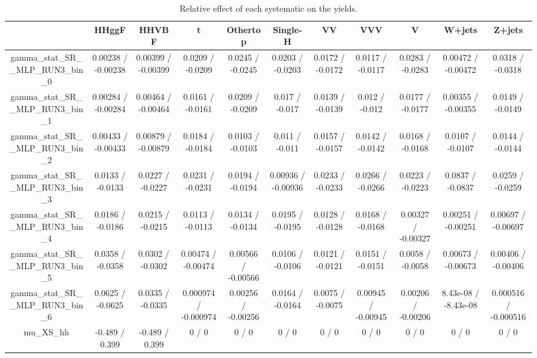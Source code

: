 \documentclass[10pt]{article}
\begin{document}
\begin{table}[htbp]
\begin{center}
\begin{tabular}{|c|c|c|c|c|c|c|c|c|c|c|}
\hline 
      & HHggF      & HHVBF      & t      & Othertop      & Single-H      & VV      & VVV      & V      & W+jets      & Z+jets \\ 
\hline 
  gamma_stat_SR__MLP_RUN3_bin_0 & 0.00238 / -0.00238 & 0.00399 / -0.00399 & 0.0209 / -0.0209 & 0.0245 / -0.0245 & 0.0203 / -0.0203 & 0.0172 / -0.0172 & 0.0117 / -0.0117 & 0.0283 / -0.0283 & 0.00472 / -0.00472 & 0.0318 / -0.0318 \\ 
  gamma_stat_SR__MLP_RUN3_bin_1 & 0.00284 / -0.00284 & 0.00464 / -0.00464 & 0.0161 / -0.0161 & 0.0209 / -0.0209 & 0.017 / -0.017 & 0.0139 / -0.0139 & 0.012 / -0.012 & 0.0177 / -0.0177 & 0.00355 / -0.00355 & 0.0149 / -0.0149 \\ 
  gamma_stat_SR__MLP_RUN3_bin_2 & 0.00433 / -0.00433 & 0.00879 / -0.00879 & 0.0184 / -0.0184 & 0.0103 / -0.0103 & 0.011 / -0.011 & 0.0157 / -0.0157 & 0.0142 / -0.0142 & 0.0168 / -0.0168 & 0.0107 / -0.0107 & 0.0144 / -0.0144 \\ 
  gamma_stat_SR__MLP_RUN3_bin_3 & 0.0133 / -0.0133 & 0.0227 / -0.0227 & 0.0231 / -0.0231 & 0.0194 / -0.0194 & 0.00936 / -0.00936 & 0.0233 / -0.0233 & 0.0266 / -0.0266 & 0.0223 / -0.0223 & 0.0837 / -0.0837 & 0.0259 / -0.0259 \\ 
  gamma_stat_SR__MLP_RUN3_bin_4 & 0.0186 / -0.0186 & 0.0215 / -0.0215 & 0.0113 / -0.0113 & 0.0134 / -0.0134 & 0.0195 / -0.0195 & 0.0128 / -0.0128 & 0.0168 / -0.0168 & 0.00327 / -0.00327 & 0.00251 / -0.00251 & 0.00697 / -0.00697 \\ 
  gamma_stat_SR__MLP_RUN3_bin_5 & 0.0358 / -0.0358 & 0.0302 / -0.0302 & 0.00474 / -0.00474 & 0.00566 / -0.00566 & 0.0106 / -0.0106 & 0.0121 / -0.0121 & 0.0151 / -0.0151 & 0.0058 / -0.0058 & 0.00673 / -0.00673 & 0.00406 / -0.00406 \\ 
  gamma_stat_SR__MLP_RUN3_bin_6 & 0.0625 / -0.0625 & 0.0335 / -0.0335 & 0.000974 / -0.000974 & 0.00256 / -0.00256 & 0.0164 / -0.0164 & 0.0075 / -0.0075 & 0.00945 / -0.00945 & 0.00206 / -0.00206 & 8.43e-08 / -8.43e-08 & 0.000516 / -0.000516 \\ 
  mu_XS_hh & -0.489 / 0.399 & -0.489 / 0.399 & 0 / 0 & 0 / 0 & 0 / 0 & 0 / 0 & 0 / 0 & 0 / 0 & 0 / 0 & 0 / 0 \\ 
\hline 
\end{tabular} 
\caption{Relative effect of each systematic on the yields.} 
\end{center} 
\end{table} 
\end{document}
